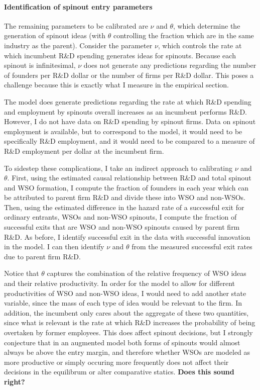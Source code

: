 \documentclass[12pt,english]{article}
\theoremstyle{remark}
\begin{document}
\paragraph{Identification of spinout entry parameters}

The remaining parameters to be calibrated are $\nu$ and $\theta$, which determine the generation of spinout ideas (with $\theta$ controlling the fraction which are in the same industry as the parent). Consider the parameter $\nu$, which controls the rate at which incumbent R\&D spending generates ideas for spinouts. Because each spinout is infinitesimal, $\nu$ does not generate any predictions regarding the number of founders per R\&D dollar or the number of firms per R\&D dollar. This poses a challenge because this is exactly what I measure in the empirical section. 

The model does generate predictions regarding the rate at which R\&D spending and employment by spinouts overall increases as an incumbent performs R\&D. However, I do not have data on R\&D spending by spinout firms. Data on spinout employment is available, but to correspond to the model, it would need to be specifically R\&D employment, and it would need to be compared to a measure of R\&D employment per dollar at the incumbent firm. 

To sidestep these complications, I take an indirect approach to calibrating $\nu$ and $\theta$. First, using the estimated causal relationship between R\&D and total spinout and WSO formation, I compute the fraction of founders in each year which can be attributed to parent firm R\&D and divide these into WSO and non-WSOs. Then, using the estimated difference in the hazard rate of a successful exit for ordinary entrants, WSOs and non-WSO spinouts, I compute the fraction of successful exits that are WSO and non-WSO spinouts caused by parent firm R\&D. As before, I identify successful exit in the data with successful innovation in the model. I can then identify $\nu$ and $\theta$ from the measured successful exit rates due to parent firm R\&D. 

Notice that $\theta$ captures the combination of the relative frequency of WSO ideas and their relative productivity. In order for the model to allow for different productivities of WSO and non-WSO ideas, I would need to add another state variable, since the mass of each type of idea would be relevant to the firm. In addition, the incumbent only cares about the aggregate of these two quantities, since what is relevant is the rate at which R\&D increases the probability of being overtaken by former employees. This does affect spinout decisions, but I strongly conjecture that in an augmented model both forms of spinouts would almost always be above the entry margin, and therefore whether WSOs are modeled as more productive or simply occuring more frequently does not affect their decisions in the equilibrum or alter comparative statics. \textbf{Does this sound right?}
\end{document}
